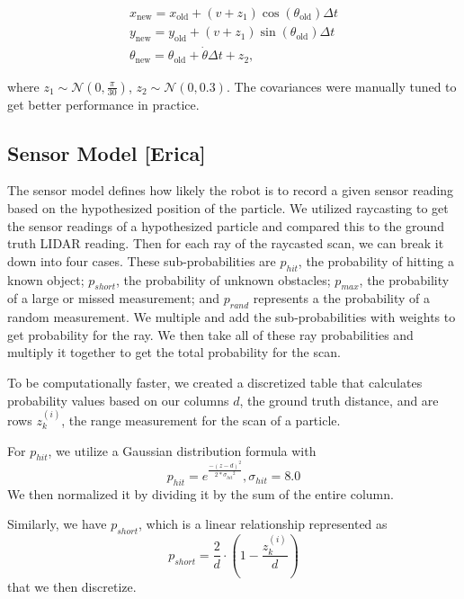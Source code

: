 \documentclass[11pt,twocolumn]{article}
\begin{document}
\begin{subequations}
    \begin{gather}
        x_\text{new}=x_\text{old}+(v+z_1) \cos(\theta_\text{old}) \Delta t\\
        y_\text{new}=y_\text{old}+(v+z_1) \sin(\theta_\text{old}) \Delta t\\
        \theta_\text{new}=\theta_\text{old}+\dot{\theta} \Delta t+z_2,
    \end{gather}
\end{subequations}

where $z_1 \sim \mathcal{N}(0,\frac{\pi}{30})$, $z_2 \sim \mathcal{N}(0,0.3)$. The covariances were manually tuned to get better performance in practice.

\subsection{Sensor Model [Erica]}

The sensor model defines how likely the robot is to record a given sensor reading based on the hypothesized position of the particle. We utilized raycasting to get the sensor readings of a hypothesized particle and compared this to the ground truth LIDAR reading. Then for each ray of the raycasted scan, we can break it down into four cases. These sub-probabilities are $p_{hit}$, the probability of hitting a known object; $p_{short}$, the probability of unknown obstacles; $p_{max}$, the probability of a large or missed measurement; and $p_{rand}$ represents a the probability of a random measurement. We multiple and add the sub-probabilities with weights to get probability for the ray. We then take all of these ray probabilities and multiply it together to get the total probability for the scan.

To be computationally faster, we created a discretized table that calculates probability values based on our columns $d$, the ground truth distance, and are rows $z^{(i)}_k$, the range measurement for the scan of a particle.

For $p_{hit}$, we utilize a Gaussian distribution formula with
\begin{equation}
p_{hit} = e^{\frac{-(z-d)^2}{2*{\sigma_{hit}}^2}}, 
 \sigma_{hit} = 8.0 \label{eqn:equation1}
\end{equation}
We then normalized it by dividing it by the sum of the entire column.

Similarly, we have $p_{short}$, which is a linear relationship represented as
\begin{equation}
p_{short} = \frac{2}{d}\cdot(1-\frac{z^{(i)}_k}{d} )\label{eqn:equation1}
\end{equation}
that we then discretize.
\end{document}
